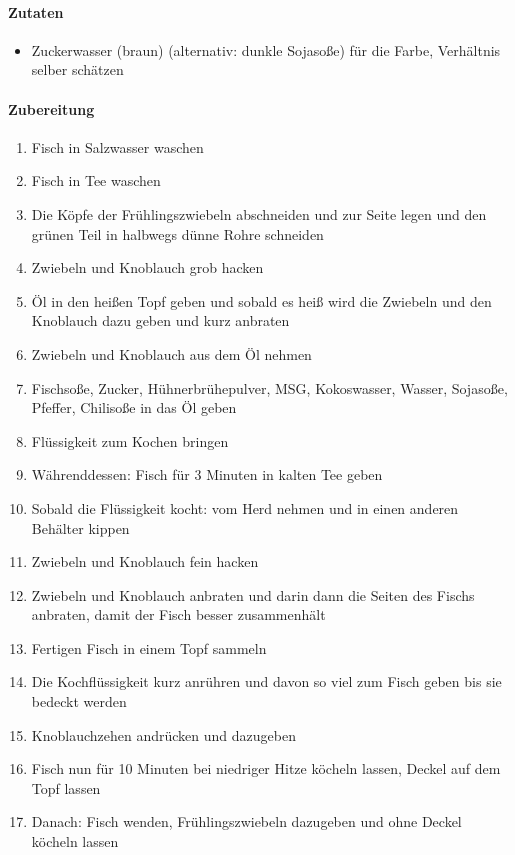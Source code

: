 \titlelink{}{}
\paragraph{Zutaten}
\begin{itemize}[noitemsep]
	\item Zuckerwasser (braun) (alternativ: dunkle Sojasoße) für die Farbe, Verhältnis selber schätzen
\end{itemize}

\paragraph{Zubereitung}
\begin{enumerate}[noitemsep]
	\item Fisch in Salzwasser waschen 
	\item Fisch in Tee waschen 
	\item Die Köpfe der Frühlingszwiebeln abschneiden und zur Seite legen und den grünen Teil in halbwegs dünne Rohre schneiden
	\item Zwiebeln und Knoblauch grob hacken
	\item Öl in den heißen Topf geben und sobald es heiß wird die Zwiebeln und den Knoblauch dazu geben und kurz anbraten
	\item Zwiebeln und Knoblauch aus dem Öl nehmen
	\item Fischsoße, Zucker, Hühnerbrühepulver, MSG, Kokoswasser, Wasser, Sojasoße, Pfeffer, Chilisoße in das Öl geben
	\item Flüssigkeit zum Kochen bringen
	\item Währenddessen: Fisch für 3 Minuten in kalten Tee geben
	\item Sobald die Flüssigkeit kocht: vom Herd nehmen und in einen anderen Behälter kippen
	\item Zwiebeln und Knoblauch fein hacken
	\item Zwiebeln und Knoblauch anbraten und darin dann die Seiten des Fischs anbraten, damit der Fisch besser zusammenhält
	\item Fertigen Fisch in einem Topf sammeln
	\item Die Kochflüssigkeit kurz anrühren und davon so viel zum Fisch geben bis sie bedeckt werden
	\item Knoblauchzehen andrücken und dazugeben
	\item Fisch nun für 10 Minuten bei niedriger Hitze köcheln lassen, Deckel auf dem Topf lassen
	\item Danach: Fisch wenden, Frühlingszwiebeln dazugeben und ohne Deckel köcheln lassen
\end{enumerate}